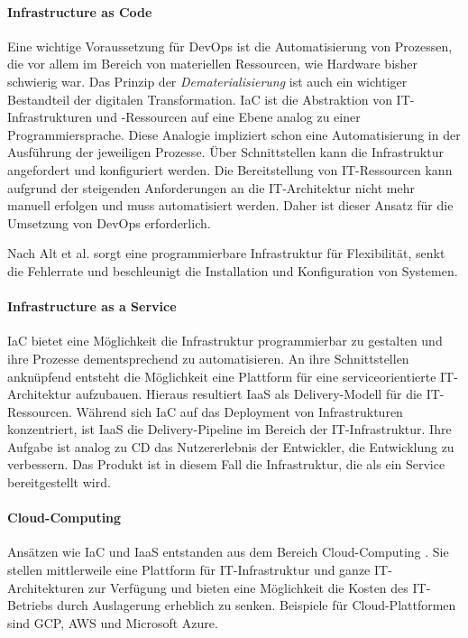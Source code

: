 \paragraph{Infrastructure as Code}
Eine wichtige Voraussetzung für DevOps ist die Automatisierung von Prozessen, die vor allem im Bereich von materiellen Ressourcen, wie Hardware bisher schwierig war. Das Prinzip der \emph{Dematerialisierung} ist auch ein wichtiger Bestandteil der digitalen Transformation.
\ac{IaC} ist die Abstraktion von IT-Infrastrukturen und -Ressourcen auf eine Ebene analog zu einer Programmiersprache. Diese Analogie impliziert schon eine Automatisierung in der Ausführung der jeweiligen Prozesse. Über Schnittstellen kann die Infrastruktur angefordert und konfiguriert werden. Die Bereitstellung von IT-Ressourcen kann aufgrund der steigenden Anforderungen an die IT-Architektur \cite{Brockhoff2006, Bussmann2006, Alt2017} nicht mehr manuell erfolgen und muss automatisiert werden. Daher ist dieser Ansatz für die Umsetzung von DevOps erforderlich.

Nach Alt et al. \cite{Alt2017} sorgt eine programmierbare Infrastruktur für Flexibilität, senkt die Fehlerrate und beschleunigt die Installation und Konfiguration von Systemen.

\paragraph{Infrastructure as a Service}
\ac{IaC} bietet eine Möglichkeit die Infrastruktur programmierbar zu gestalten und ihre Prozesse dementsprechend zu automatisieren. An ihre Schnittstellen anknüpfend entsteht die Möglichkeit eine Plattform für eine serviceorientierte IT-Architektur aufzubauen. Hieraus resultiert \ac{IaaS} als Delivery-Modell \cite{Alt2017} für die IT-Ressourcen. Während sich \ac{IaC} auf das Deployment von Infrastrukturen konzentriert, ist \ac{IaaS} die Delivery-Pipeline im Bereich der IT-Infrastruktur. Ihre Aufgabe ist analog zu \ac{CD} das Nutzererlebnis der Entwickler, die Entwicklung zu verbessern. Das Produkt ist in diesem Fall die Infrastruktur, die als ein Service bereitgestellt wird.

\paragraph{Cloud-Computing}
Ansätzen wie \ac{IaC} und \ac{IaaS} entstanden aus dem Bereich Cloud-Computing \cite{Alt2017}. Sie stellen mittlerweile eine Plattform für IT-Infrastruktur und ganze IT-Architekturen zur Verfügung und bieten eine Möglichkeit die Kosten des IT-Betriebs durch Auslagerung erheblich zu senken. Beispiele für Cloud-Plattformen sind \ac{GCP}, \ac{AWS} und Microsoft Azure.

